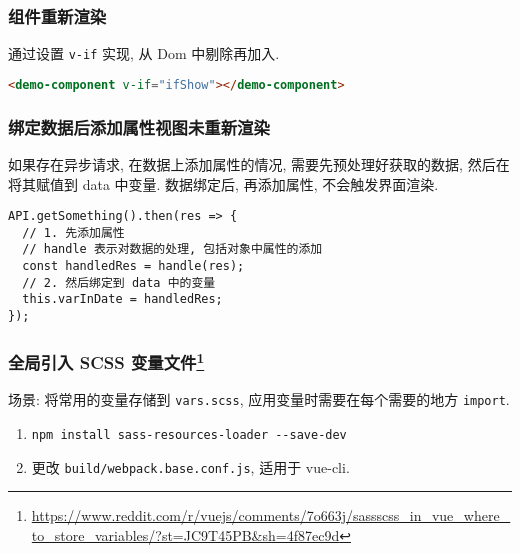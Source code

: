 \subsubsection{组件重新渲染}\label{ux7ec4ux4ef6ux91cdux65b0ux6e32ux67d3}

通过设置 \lstinline!v-if! 实现, 从 Dom 中剔除再加入.

\begin{lstlisting}[language=HTML]
<demo-component v-if="ifShow"></demo-component>
\end{lstlisting}

\subsubsection{绑定数据后添加属性视图未重新渲染}\label{ux7ed1ux5b9aux6570ux636eux540eux6dfbux52a0ux5c5eux6027ux89c6ux56feux672aux91cdux65b0ux6e32ux67d3}

如果存在异步请求, 在数据上添加属性的情况, 需要先预处理好获取的数据,
然后在将其赋值到 data 中变量. 数据绑定后, 再添加属性, 不会触发界面渲染.

\begin{lstlisting}
API.getSomething().then(res => {
  // 1. 先添加属性
  // handle 表示对数据的处理, 包括对象中属性的添加
  const handledRes = handle(res);
  // 2. 然后绑定到 data 中的变量
  this.varInDate = handledRes;
});
\end{lstlisting}

\subsubsection[全局引入 SCSS 变量文件]{\texorpdfstring{全局引入 SCSS
变量文件\footnote{\url{https://www.reddit.com/r/vuejs/comments/7o663j/sassscss_in_vue_where_to_store_variables/?st=JC9T45PB\&sh=4f87ec9d}}}{全局引入 SCSS 变量文件}}\label{ux5168ux5c40ux5f15ux5165-scss-ux53d8ux91cfux6587ux4ef6vueglobalimportvariablesfile}

场景: 将常用的变量存储到 \lstinline!vars.scss!,
应用变量时需要在每个需要的地方 \lstinline!import!.

\begin{enumerate}
\def\labelenumi{\arabic{enumi}.}
\tightlist
\item
  \lstinline!npm install sass-resources-loader --save-dev!
\item
  更改 \lstinline!build/webpack.base.conf.js!, 适用于 vue-cli.
\end{enumerate}

